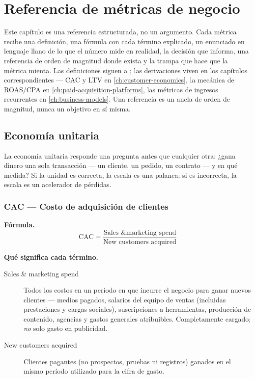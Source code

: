 \chapter{Referencia de métricas de negocio}\label{ch:metrics-catalog}


Este capítulo es una referencia estructurada, no un argumento. Cada métrica recibe una
definición, una fórmula con cada término explicado, un enunciado en lenguaje llano de lo
que el número mide en realidad, la decisión que informa, una referencia de orden de magnitud
donde exista y la trampa que hace que la métrica mienta. Las definiciones siguen a
\textcite{bendle2020marketing}; las derivaciones viven en los capítulos correspondientes ---
CAC y LTV en \cref{ch:customer-economics}, la mecánica de ROAS/CPA en
\cref{ch:paid-acquisition-platforms}, las métricas de ingresos recurrentes en
\cref{ch:business-models}. Una referencia es un ancla de orden de magnitud, nunca un
objetivo en sí misma.


\section{Economía unitaria}

La economía unitaria responde una pregunta antes que cualquier otra: ¿gana dinero una sola
transacción --- un cliente, un pedido, un contrato --- y en qué medida? Si la unidad es
correcta, la escala es una palanca; si es incorrecta, la escala es un acelerador de pérdidas.

\subsection{CAC --- Costo de adquisición de clientes}

\textbf{Fórmula.}
\[
  \mathrm{CAC} = \frac{\text{Sales \& marketing spend}}{\text{New customers acquired}}
\]

\textbf{Qué significa cada término.}
\begin{description}
  \item[Sales \& marketing spend] Todos los costos en un período en que incurre el negocio
    para ganar nuevos clientes --- medios pagados, salarios del equipo de ventas (incluidas
    prestaciones y cargas sociales), suscripciones a herramientas, producción de contenido,
    agencias y gastos generales atribuibles. Completamente cargado; \emph{no} solo gasto en
    publicidad.
  \item[New customers acquired] Clientes pagantes (no prospectos, pruebas ni registros)
    ganados en el mismo período utilizado para la cifra de gasto.
\end{description}

